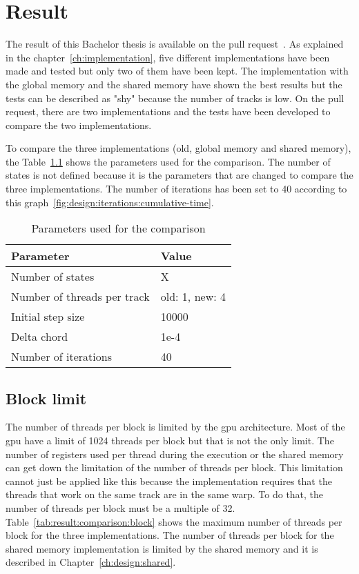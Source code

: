 \chapter{Result}
\label{ch:result}

The result of this Bachelor thesis is available on the pull request~\cite{pull-request-barras}.
As explained in the chapter~\ref{ch:implementation}, five different
implementations have been made and tested but only two of them have been kept.
The implementation with the global memory and the shared memory have shown the
best results but the tests can be described as "shy" because the number of
tracks is low.
On the pull request, there are two implementations and the tests have been
developed to compare the two implementations.

To compare the three implementations (old, global memory and shared memory), the
Table~\ref{tab:result:comparison:parameters} shows the parameters used for the
comparison.
The number of states is not defined because it is the parameters that are changed
to compare the three implementations.
The number of iterations has been set to 40 according to this
graph~\ref{fig:design:iterations:cumulative-time}.

\begin{table}[ht]
    \centering
    \begin{tabular}{|l|l|}
        \hline
        \textbf{Parameter} & \textbf{Value} \\
        \hline
        Number of states & X \\
        \hline
        Number of threads per track & old: 1, new: 4 \\
        \hline
        Initial step size & 10000 \\
        \hline
        Delta chord & 1e-4 \\
        \hline
        Number of iterations & 40 \\
        \hline
    \end{tabular}
    \caption{Parameters used for the comparison}
    \label{tab:result:comparison:parameters}
\end{table}

\section{Block limit}
\label{ch:result:comparison:block}

The number of threads per block is limited by the \acrshort{gpu} architecture.
Most of the \acrshort{gpu} have a limit of 1024 threads per block but that is
not the only limit.
The number of registers used per thread during the execution or the shared memory
can get down the limitation of the number of threads per block.
This limitation cannot just be applied like this because the implementation
requires that the threads that work on the same track are in the same warp.
To do that, the number of threads per block must be a multiple of 32.
Table~\ref{tab:result:comparison:block} shows the maximum number of threads per
block for the three implementations.
The number of threads per block for the shared memory implementation is limited
by the shared memory and it is described in Chapter~\ref{ch:design:shared}.

